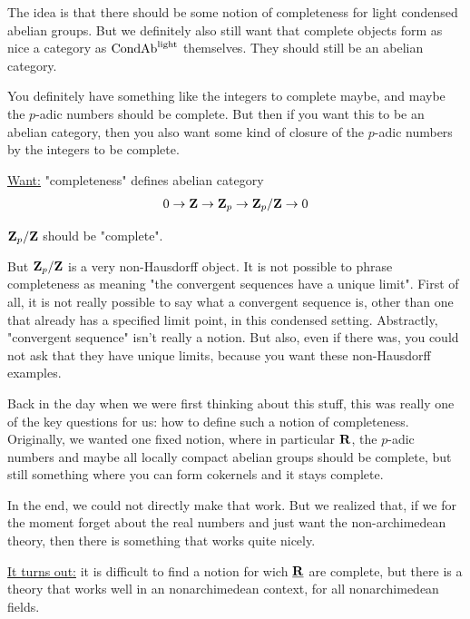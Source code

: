 The idea is that there should be some notion of completeness for light condensed abelian groups. 
But we definitely also still want that complete objects form as nice a category as $\mathrm{Cond}\mathrm{Ab}^{\mathrm{light}}$ themselves. 
They should still be an abelian category.

You definitely have something like the integers to complete maybe, and maybe the $p$-adic numbers should be complete. But then if you want this to be an abelian category, then you also want some kind of closure of the $p$-adic numbers by the integers to be complete. 

\begin{desiderata}
\underline{Want:} "completeness" defines abelian category 
\begin{align*}
0 \to \mathbf Z \to \mathbf Z_p \to \mathbf Z_p / \mathbf Z \to 0
\end{align*}

$\mathbf Z_p / \mathbf Z$ should be "complete".

\end{desiderata}

But $\mathbf Z_p / \mathbf Z$ is a very non-Hausdorff object. It is not possible to phrase completeness as meaning "the convergent sequences have a unique limit". 
First of all, it is not really possible to say what a convergent sequence is, other than one that already has a specified limit point, in this condensed setting. 
Abstractly, "convergent sequence" isn't really a notion. But also, even if there was, you could not ask that they have unique limits, because you want these non-Hausdorff examples.

Back in the day when we were first thinking about this stuff, this was really one of the key questions for us: how to define such a notion of completeness. Originally, we wanted one fixed notion, where in particular $\mathbf R$, the $p$-adic numbers and maybe all locally compact abelian groups should be complete, but still something where you can form cokernels and it stays complete.

In the end, we could not directly make that work. 
But we realized that, if we for the moment forget about the real numbers and just want the non-archimedean theory, then there is something that works quite nicely. 

\underline{It turns out:} it is difficult to find a notion for wich $\underline{\mathbf R}$ are complete, but there is a theory that works well in an nonarchimedean context, for all nonarchimedean fields.

